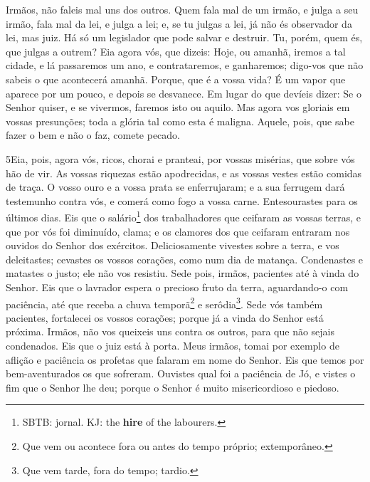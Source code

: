Irmãos, não faleis mal uns dos outros. Quem fala mal de um irmão,
e julga a seu irmão, fala mal da lei, e julga a lei; e, se tu julgas
a lei, já não és observador da lei, mas juiz. Há só um
legislador que pode salvar e destruir. Tu, porém, quem és, que
julgas a outrem? Eia agora vós, que dizeis: Hoje, ou amanhã,
iremos a tal cidade, e lá passaremos um ano, e contrataremos, e
ganharemos; digo-vos que não sabeis o que acontecerá amanhã.
Porque, que é a vossa vida? É um vapor que aparece por um pouco, e
depois se desvanece. Em lugar do que devíeis dizer: Se o
Senhor quiser, e se vivermos, faremos isto ou aquilo. Mas
agora vos gloriais em vossas presunções; toda a glória tal como esta
é maligna. Aquele, pois, que sabe fazer o bem e não o faz,
comete pecado.

\medskip

\lettrine{5} Eia, pois, agora vós, ricos, chorai e pranteai,
por vossas misérias, que sobre vós hão de vir. As vossas
riquezas estão apodrecidas, e as vossas vestes estão comidas de
traça. O vosso ouro e a vossa prata se enferrujaram; e a sua
ferrugem dará testemunho contra vós, e comerá como fogo a vossa
carne. Entesourastes para os últimos dias. Eis que o
salário\footnote{SBTB: jornal. KJ: the \textbf{hire} of the
labourers.} dos trabalhadores que ceifaram as vossas terras, e que
por vós foi diminuído, clama; e os clamores dos que ceifaram
entraram nos ouvidos do Senhor dos exércitos. Deliciosamente
vivestes sobre a terra, e vos deleitastes; cevastes os vossos
corações, como num dia de matança. Condenastes e matastes o
justo; ele não vos resistiu. Sede pois, irmãos, pacientes até à
vinda do Senhor. Eis que o lavrador espera o precioso fruto da
terra, aguardando-o com paciência, até que receba a chuva
temporã\footnote{Que vem ou acontece fora ou antes do tempo próprio;
extemporâneo.} e serôdia\footnote{Que vem tarde, fora do tempo;
tardio.}. Sede vós também pacientes, fortalecei os vossos
corações; porque já a vinda do Senhor está próxima. Irmãos, não
vos queixeis uns contra os outros, para que não sejais condenados.
Eis que o juiz está à porta. Meus irmãos, tomai por exemplo
de aflição e paciência os profetas que falaram em nome do Senhor.
Eis que temos por bem-aventurados os que sofreram. Ouvistes
qual foi a paciência de Jó, e vistes o fim que o Senhor lhe deu;
porque o Senhor é muito misericordioso e piedoso.

